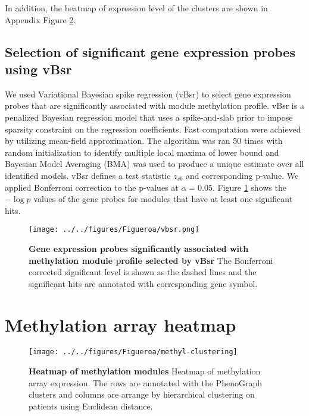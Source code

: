 \documentclass{article}
\begin{document}
In addition, the heatmap of expression level of the clusters are shown in Appendix Figure \ref{heatmap}.

\clearpage

\subsection{Selection of significant gene expression probes using vBsr}
We used Variational Bayesian spike regression (vBsr) \cite{logsdon2012novel} to select gene expression probes that are significantly associated with module methylation profile. vBsr is a penalized Bayesian regression model that uses a spike-and-slab prior to impose sparsity constraint on the regression coefficients. Fast computation were achieved by utilizing mean-field approximation. The algorithm was ran 50 times with random initialization to identify multiple local maxima of lower bound and Bayesian Model Averaging (BMA) was used to produce a unique estimate over all identified models. vBsr defines a test statistic $z_{vb}$ and corresponding p-value. We applied Bonferroni correction to the p-values at $\alpha = 0.05$. Figure \ref{vbsr} shows the $-\log p$ values of the gene probes for modules that have at least one significant hits.

\begin{figure}[htbp]
\begin{center}
\texttt{[image: ../../figures/Figueroa/vbsr.png]}
\caption[Gene expression probes significantly associated with methylation module profile selected by vBsr]{\textbf{Gene expression probes significantly associated with methylation module profile selected by vBsr} The Bonferroni corrected significant level is shown as the dashed lines and the significant hits are annotated with corresponding gene symbol. }
\label{vbsr}
\end{center}
\end{figure}

\clearpage

\appendix

\section{Methylation array heatmap}

\begin{figure}[htbp]
\begin{center}
\texttt{[image: ../../figures/Figueroa/methyl-clustering]}
\caption[Heatmap of methylation modules]{\textbf{Heatmap of methylation modules} Heatmap of methylation array expression. The rows are annotated with the PhenoGraph clusters and columns are arrange by hierarchical clustering on patients using Euclidean distance. }
\label{heatmap}
\end{center}
\end{figure}


\clearpage

 

\end{document}
